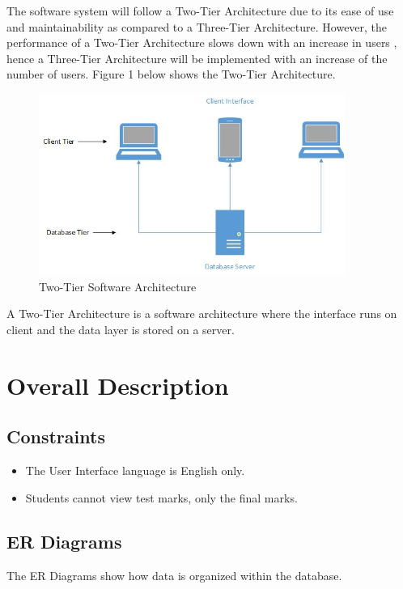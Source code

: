 \documentclass[10pt,onecolumn]{RequimentsGathering}
\begin{document}
The software system will follow a Two-Tier Architecture due to its ease of use and maintainability as compared to a Three-Tier Architecture. However, the performance of a Two-Tier Architecture slows down with an increase in users \cite{ref3}, hence a Three-Tier Architecture will be implemented with an increase of the number of users. Figure 1 below shows the Two-Tier Architecture.   
\begin{center}
\begin{figure}[h]
\centering
\includegraphics[width=10cm]{Two-Tier}
\caption{Two-Tier Software Architecture}
\end{figure}
\end{center}


A Two-Tier Architecture is a software architecture where the interface runs on client and the data layer is stored on a server\cite{ref4}.

\section{Overall Description}	

\subsection{Constraints }
\begin{itemize}
\item The User Interface language is English only.
\item Students cannot view test marks, only the final marks.
\end{itemize}


\subsection{ER Diagrams }
The ER Diagrams show how data is organized within the database.
\end{document}
